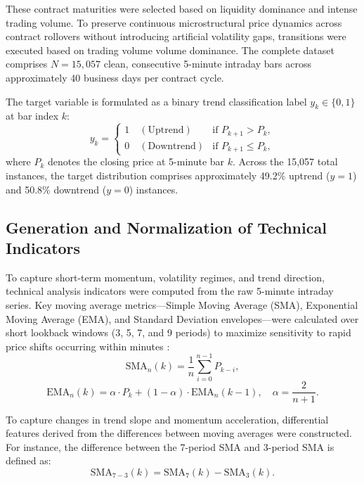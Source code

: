 These contract maturities were selected based on liquidity dominance and intense trading volume. To preserve continuous microstructural price dynamics across contract rollovers without introducing artificial volatility gaps, transitions were executed based on trading volume volume dominance. The complete dataset comprises $N = 15{,}057$ clean, consecutive 5-minute intraday bars across approximately 40 business days per contract cycle.

The target variable is formulated as a binary trend classification label $y_k \in \{0, 1\}$ at bar index $k$:
\begin{equation}\label{eq:target}
    y_k = \begin{cases} 1 \quad (\text{Uptrend}) & \text{if } P_{k+1} > P_k, \\ 0 \quad (\text{Downtrend}) & \text{if } P_{k+1} \le P_k, \end{cases}
\end{equation}
where $P_k$ denotes the closing price at 5-minute bar $k$. Across the 15,057 total instances, the target distribution comprises approximately 49.2\% uptrend ($y=1$) and 50.8\% downtrend ($y=0$) instances.

\subsection{Generation and Normalization of Technical Indicators}\label{sec:indicators}

To capture short-term momentum, volatility regimes, and trend direction, technical analysis indicators were computed from the raw 5-minute intraday series. Key moving average metrics---Simple Moving Average (SMA), Exponential Moving Average (EMA), and Standard Deviation envelopes---were calculated over short lookback windows (3, 5, 7, and 9 periods) to maximize sensitivity to rapid price shifts occurring within minutes \cite{hunter1986exponentially}:
\begin{equation}\label{eq:sma}
    \text{SMA}_n(k) = \frac{1}{n} \sum_{i=0}^{n-1} P_{k-i},
\end{equation}
\begin{equation}\label{eq:ema}
    \text{EMA}_n(k) = \alpha \cdot P_k + (1 - \alpha) \cdot \text{EMA}_n(k-1), \quad \alpha = \frac{2}{n+1}.
\end{equation}

To capture changes in trend slope and momentum acceleration, differential features derived from the differences between moving averages were constructed. For instance, the difference between the 7-period SMA and 3-period SMA is defined as:
\begin{equation}\label{eq:diff}
    \text{SMA}_{7-3}(k) = \text{SMA}_7(k) - \text{SMA}_3(k).
\end{equation}

